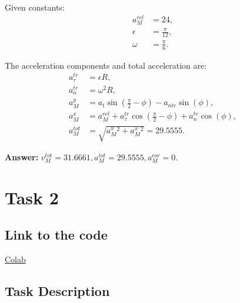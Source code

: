 \documentclass{article}
\begin{document}
Given constants:
\begin{align*}
a_{M}^{rel} &= 24, \\
\epsilon &= \frac{\pi}{12}, \\
\omega &= \frac{\pi}{6}.
\end{align*}

The acceleration components and total acceleration are:
\begin{align*}
a_{\tau}^{tr} &= \epsilon R, \\
a_{n}^{tr} &= \omega^2 R, \\
a_{M}^{y} &= a_{t} \sin\left(\frac{\pi}{2} - \phi\right) - a_{ntr} \sin(\phi), \\
a_{M}^{x} &= a_{M}^{rel} + a_{\tau}^{tr} \cos\left(\frac{\pi}{2} - \phi\right) + a_{n}^{tr} \cos(\phi), \\
a_{M}^{tot} &= \sqrt{a_{M}^{y}^2 + a_{M}^{x}^2} = 29.5555.
\end{align*}


\textbf{Answer: } $v_{M}^{tot} = 31.6661, a_{M}^{tot} = 29.5555, a_{M}^{cor} = 0$.


\section{Task 2}

\subsection{Link to the code}

\href{https://colab.research.google.com/drive/1K30VRx8tulT4y-6lVtZL8YNYCSKICuj9?usp=sharing}{Colab}

\subsection{Task Description}
\end{document}
